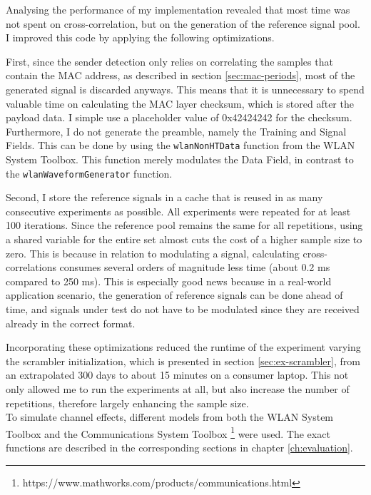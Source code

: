 Analysing the performance of my implementation revealed that most time was not spent on cross-correlation, but on the generation of the reference signal pool. I improved this code by applying the following optimizations.

First, since the sender detection only relies on correlating the samples that contain the MAC address, as described in section \ref{sec:mac-periods}, most of the generated signal is discarded anyways. This means that it is unnecessary to spend valuable time on calculating the MAC layer checksum, which is stored after the payload data. I simple use a placeholder value of 0x42424242 for the checksum. Furthermore, I do not generate the preamble, namely the Training and Signal Fields. This can be done by using the \texttt{wlanNonHTData} function from the WLAN System Toolbox. This function merely modulates the Data Field, in contrast to the \texttt{wlanWaveformGenerator} function.

Second, I store the reference signals in a cache that is reused in as many consecutive experiments as possible. All experiments were repeated for at least 100 iterations. Since the reference pool remains the same for all repetitions, using a shared variable for the entire set almost cuts the cost of a higher sample size to zero. This is because in relation to modulating a signal, calculating cross-correlations consumes several orders of magnitude less time (about 0.2 ms compared to 250 ms). This is especially good news because in a real-world application scenario, the generation of reference signals can be done ahead of time, and signals under test do not have to be modulated since they are received already in the correct format.

Incorporating these optimizations reduced the runtime of the experiment varying the scrambler initialization, which is presented in section \ref{sec:ex-scrambler}, from an extrapolated 300 days to about 15 minutes on a consumer laptop. This not only allowed me to run the experiments at all, but also increase the number of repetitions, therefore largely enhancing the sample size.\\

To simulate channel effects, different models from both the WLAN System Toolbox and the Communications System Toolbox \footnote{https://www.mathworks.com/products/communications.html} were used. The exact functions are described in the corresponding sections in chapter \ref{ch:evaluation}.\\

